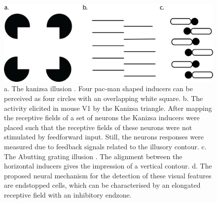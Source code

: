 \documentclass[12pt]{article}
\begin{document}
\begin{figure}[H]
    \centering
    \includegraphics[width=1.0\textwidth]{adjusted_figures/illusory_figure.png}
    \caption{a. The kanizsa illusion \autocite{kanizsaSubjectiveContours1976}. Four pac-man shaped inducers can be perceived as four circles with an overlapping white square. b. The activity elicited in mouse V1 by the Kanizsa triangle. After mapping the receptive fields of a set of neurons the Kanizsa inducers were placed such that the receptive fields of these neurons were not stimulated by feedforward input. Still, the neurons responses were measured due to feedback signals related to the illusory contour.
    c. The Abutting grating illusion \autocite{sorianoAbuttingGratingIllusion1996}. The alignment between the horizontal inducers gives the impression of a vertical contour. d. The proposed neural mechanism for the detection of these visual features are endstopped cells, which can be characterised by an elongated receptive field with an inhibitory endzone.}
    \label{fig:figure_1}
\end{figure}
\end{document}
